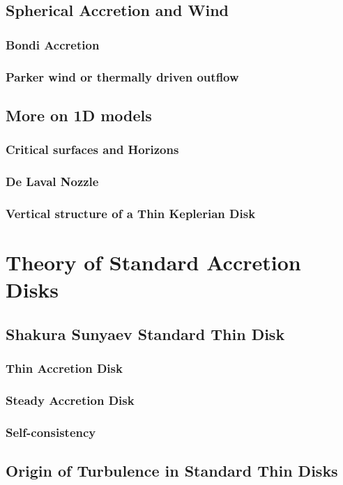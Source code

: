 \documentclass[10pt,a4paper]{article}
\begin{document}
\subsection{Spherical Accretion and Wind}
\subsubsection{Bondi Accretion}
\subsubsection{Parker wind or thermally driven outflow}
\subsection{More on 1D models}
\subsubsection{Critical surfaces and Horizons}
\subsubsection{De Laval Nozzle}
\subsubsection{Vertical structure of a Thin Keplerian Disk}

\section{Theory of Standard Accretion Disks}
\subsection{Shakura Sunyaev Standard Thin Disk}
\subsubsection{Thin Accretion Disk}
\subsubsection{Steady Accretion Disk}
\subsubsection{Self-consistency}
\subsection{Origin of Turbulence in Standard Thin Disks}
\end{document}
